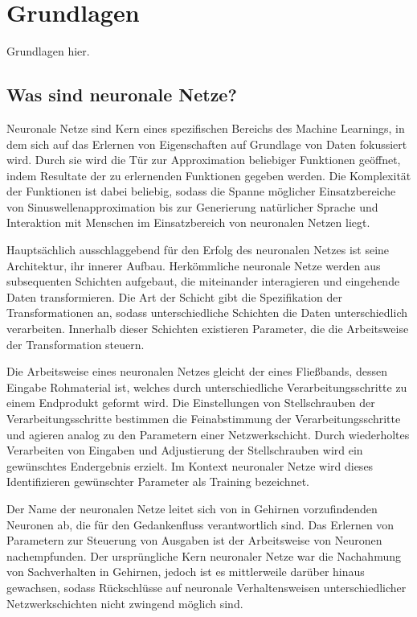 
\section{Grundlagen}
\label{sec:ki:grundlagen}

Grundlagen hier.


\subsection{Was sind neuronale Netze?}
\label{sec:was_nn}

Neuronale Netze sind Kern eines spezifischen Bereichs des Machine Learnings, in dem sich auf das Erlernen von Eigenschaften auf Grundlage von Daten fokussiert wird. Durch sie wird die Tür zur Approximation beliebiger Funktionen geöffnet, indem Resultate der zu erlernenden Funktionen gegeben werden. Die Komplexität der Funktionen ist dabei beliebig, sodass die Spanne möglicher Einsatzbereiche von Sinuswellenapproximation bis zur Generierung natürlicher Sprache und Interaktion mit Menschen im Einsatzbereich von neuronalen Netzen liegt.

Hauptsächlich ausschlaggebend für den Erfolg des neuronalen Netzes ist seine Architektur, ihr innerer Aufbau. Herkömmliche neuronale Netze werden aus subsequenten Schichten aufgebaut, die miteinander interagieren und eingehende Daten transformieren. Die Art der Schicht gibt die Spezifikation der Transformationen an, sodass unterschiedliche Schichten die Daten unterschiedlich verarbeiten. Innerhalb dieser Schichten existieren Parameter, die die Arbeitsweise der Transformation steuern.

Die Arbeitsweise eines neuronalen Netzes gleicht der eines Fließbands, dessen Eingabe Rohmaterial ist, welches durch unterschiedliche Verarbeitungsschritte zu einem Endprodukt geformt wird. Die Einstellungen von Stellschrauben der Verarbeitungsschritte bestimmen die Feinabstimmung der Verarbeitungsschritte und agieren analog zu den Parametern einer Netzwerkschicht. Durch wiederholtes Verarbeiten von Eingaben und Adjustierung der Stellschrauben wird ein gewünschtes Endergebnis erzielt. Im Kontext neuronaler Netze wird dieses Identifizieren gewünschter Parameter als Training bezeichnet.

Der Name der neuronalen Netze leitet sich von in Gehirnen vorzufindenden Neuronen ab, die für den Gedankenfluss verantwortlich sind. Das Erlernen von Parametern zur Steuerung von Ausgaben ist der Arbeitsweise von Neuronen nachempfunden. Der ursprüngliche Kern neuronaler Netze war die Nachahmung von Sachverhalten in Gehirnen, jedoch ist es mittlerweile darüber hinaus gewachsen, sodass Rückschlüsse auf neuronale Verhaltensweisen unterschiedlicher Netzwerkschichten nicht zwingend möglich sind.

